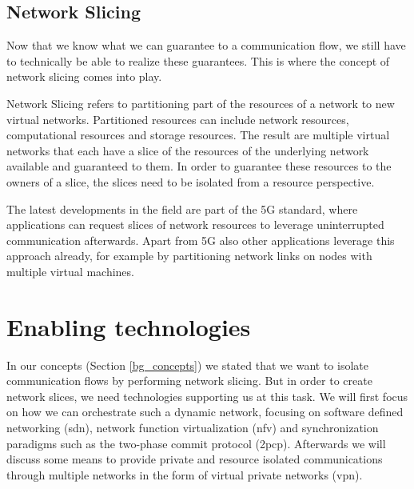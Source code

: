 \subsection{Network Slicing}
Now that we know what we can guarantee to a communication flow, we still have to technically be able to realize these guarantees. This is where the concept of network slicing comes into play.

Network Slicing \cite{slicing} refers to partitioning part of the resources of a network to new virtual networks. Partitioned resources can include network resources, computational resources and storage resources. The result are multiple virtual networks that each have a slice of the resources of the underlying network available and guaranteed to them. In order to guarantee these resources to the owners of a slice, the slices need to be isolated from a resource perspective.

The latest developments in the field are part of the 5G standard, where applications can request slices of network resources to leverage uninterrupted communication afterwards. Apart from 5G also other applications leverage this approach already, for example by partitioning network links on nodes with multiple virtual machines.


\section{Enabling technologies}
In our concepts (Section \ref{bg_concepts}) we stated that we want to isolate communication flows by performing network slicing. But in order to create network slices, we need technologies supporting us at this task. We will first focus on how we can orchestrate such a dynamic network, focusing on software defined networking (\acrshort{sdn}), network function virtualization (\acrshort{nfv}) and synchronization paradigms such as the two-phase commit protocol (\acrshort{2pcp}). Afterwards we will discuss some means to provide private and resource isolated communications through multiple networks in the form of virtual private networks (\acrshort{vpn}).

